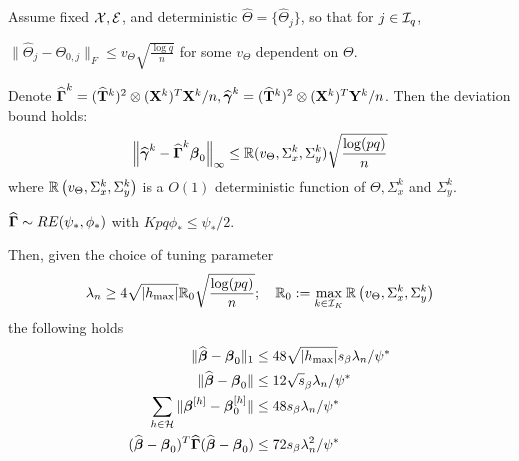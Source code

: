 \begin{Theorem}\label{thm:BetaThm}
Assume fixed ${\cal{X}}, {\cal{E}}$, and deterministic $\widehat \Theta = \{ \widehat \Theta_j \}$, so that for $j \in {\cal{I}}_q$,

 $\| \widehat \Theta_j - \Theta_{0,j} \|_F \leq v_\Theta \sqrt{\frac{\log q}{n}}$ for some $v_\Theta$ dependent on $\Theta$.

 Denote $\widehat {{\boldsymbol{\Gamma}}}^k = (\widehat {{\mathbf{T}}}^k)^2 \otimes ({\mathbf{X}}^k)^T {\mathbf{X}}^k/n, \widehat {{\boldsymbol{\gamma}}}^k = (\widehat {{\mathbf{T}}}^k)^2 \otimes ({\mathbf{X}}^k)^T {\mathbf{Y}}^k/n$. Then the deviation bound holds:
%
$$
\left\| \widehat {{\boldsymbol{\gamma}}}^k - \widehat {{\boldsymbol{\Gamma}}}^k {\boldsymbol{\beta}}_0 \right\|_\infty \leq {\mathbb{R}}( v_\Theta, \Sigma_x^k, \Sigma_y^k) \sqrt{ \frac{ \log(pq)}{n}}
$$
%
where ${\mathbb{R}} \left(v_\Theta, \Sigma_x^k, \Sigma_y^k \right)$ is a $O(1)$ deterministic function of $\Theta, \Sigma_x^k$ and $\Sigma_y^k$.

 $\widehat {{\boldsymbol{\Gamma}}} \sim RE(\psi_*, \phi_*)$ with $Kpq \phi_* \leq \psi_*/2$.

Then, given the choice of tuning parameter
%
$$
\lambda_n \geq 4 \sqrt{| h_{\max} |} {\mathbb{R}}_0 \sqrt{ \frac{ \log(pq)}{n}}; \quad 
{\mathbb{R}}_0 := \max_{k \in {\cal{I}}_K} {\mathbb{R}} \left(v_\Theta, \Sigma_x^k, \Sigma_y^k \right)
$$
%
the following holds
%
\begin{align}
\| \widehat {{\boldsymbol{\beta}}} - {\boldsymbol{\beta}}_0 \|_1 & \leq 48 \sqrt{ | h_{\max} |} s_\beta \lambda_n / \psi^* \label{eqn:BetaThmEqn1}\\
\| \widehat {{\boldsymbol{\beta}}} - {\boldsymbol{\beta}}_0 \| & \leq 12 \sqrt s_\beta \lambda_n / \psi^* \label{eqn:BetaThmEqn2}\\
\sum_{h \in {\cal{H}}} \| {\boldsymbol{\beta}}^{[h]} - {\boldsymbol{\beta}}_0^{[h]} \| & \leq 48 s_\beta \lambda_n / \psi^* \label{eqn:BetaThmEqn3}\\
(\widehat {{\boldsymbol{\beta}}} - {\boldsymbol{\beta}}_0 )^T \widehat {{\boldsymbol{\Gamma}}} (\widehat {{\boldsymbol{\beta}}} - {\boldsymbol{\beta}}_0 ) & \leq
72 s_\beta \lambda_n^2 / \psi^* \label{eqn:BetaThmEqn4}
\end{align}
%
\end{Theorem}

